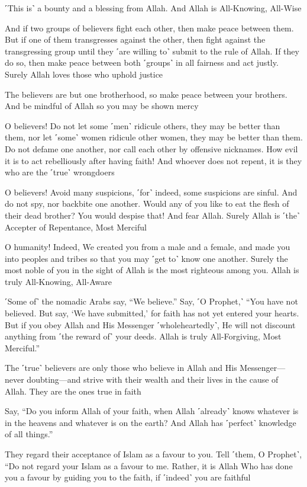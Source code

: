 ˹This is˺ a bounty and a blessing from Allah. And Allah is All-Knowing, All-Wise

And if two groups of believers fight each other, then make peace between them. But if one of them transgresses against the other, then fight against the transgressing group until they ˹are willing to˺ submit to the rule of Allah. If they do so, then make peace between both ˹groups˺ in all fairness and act justly. Surely Allah loves those who uphold justice

The believers are but one brotherhood, so make peace between your brothers. And be mindful of Allah so you may be shown mercy

O believers! Do not let some ˹men˺ ridicule others, they may be better than them, nor let ˹some˺ women ridicule other women, they may be better than them. Do not defame one another, nor call each other by offensive nicknames. How evil it is to act rebelliously after having faith! And whoever does not repent, it is they who are the ˹true˺ wrongdoers

O believers! Avoid many suspicions, ˹for˺ indeed, some suspicions are sinful. And do not spy, nor backbite one another. Would any of you like to eat the flesh of their dead brother? You would despise that! And fear Allah. Surely Allah is ˹the˺ Accepter of Repentance, Most Merciful

O humanity! Indeed, We created you from a male and a female, and made you into peoples and tribes so that you may ˹get to˺ know one another. Surely the most noble of you in the sight of Allah is the most righteous among you. Allah is truly All-Knowing, All-Aware

˹Some of˺ the nomadic Arabs say, “We believe.” Say, ˹O Prophet,˺ “You have not believed. But say, ‘We have submitted,’ for faith has not yet entered your hearts. But if you obey Allah and His Messenger ˹wholeheartedly˺, He will not discount anything from ˹the reward of˺ your deeds. Allah is truly All-Forgiving, Most Merciful.”

The ˹true˺ believers are only those who believe in Allah and His Messenger—never doubting—and strive with their wealth and their lives in the cause of Allah. They are the ones true in faith

Say, “Do you inform Allah of your faith, when Allah ˹already˺ knows whatever is in the heavens and whatever is on the earth? And Allah has ˹perfect˺ knowledge of all things.”

They regard their acceptance of Islam as a favour to you. Tell ˹them, O Prophet˺, “Do not regard your Islam as a favour to me. Rather, it is Allah Who has done you a favour by guiding you to the faith, if ˹indeed˺ you are faithful

